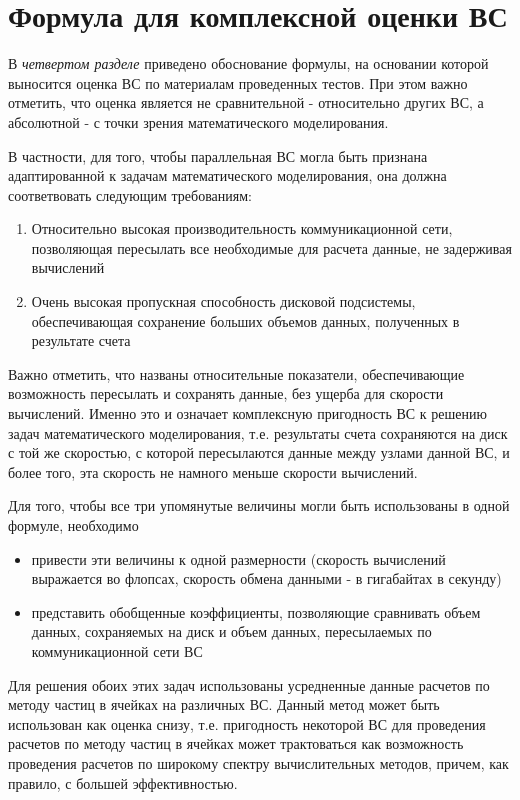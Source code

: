 \section{Формула для комплексной оценки ВС}
\label{complex_evaluation}
В \textit{четвертом разделе} приведено обоснование формулы, на основании которой выносится оценка ВС по материалам проведенных тестов. При этом важно отметить, что оценка является не сравнительной - относительно других ВС, а абсолютной - с точки зрения математического моделирования. 

В частности, для того, чтобы параллельная ВС могла быть признана адаптированной к задачам математического моделирования, она должна соответвовать следующим требованиям:
\begin{enumerate}
	\item Относительно высокая производительность коммуникационной сети, позволяющая пересылать все необходимые для расчета данные, не задерживая вычислений
	\item Очень высокая пропускная способность дисковой подсистемы, обеспечивающая сохранение больших объемов данных, полученных в результате счета  	
\end{enumerate}

Важно отметить, что названы относительные показатели, обеспечивающие возможность пересылать и сохранять данные, без ущерба для скорости вычислений. Именно это и означает  комплексную пригодность ВС к решению задач математического моделирования, т.е. результаты счета сохраняются на диск с той же скоростью, с которой пересылаются данные между узлами данной ВС, и более того, эта скорость не намного меньше скорости вычислений.

Для того, чтобы все три упомянутые величины могли быть использованы в одной формуле, необходимо 
\begin{itemize}
	\item привести эти величины к одной размерности (скорость вычислений выражается во флопсах, скорость обмена данными - в гигабайтах в секунду)
	\item представить обобщенные коэффициенты, позволяющие сравнивать объем данных, сохраняемых на диск и объем данных, пересылаемых по коммуникационной сети ВС  
\end{itemize}


Для решения обоих этих задач использованы усредненные данные расчетов по методу частиц в ячейках на различных ВС. Данный метод может быть использован как оценка снизу, т.е. пригодность некоторой ВС для проведения расчетов по методу частиц в ячейках может трактоваться как возможность проведения расчетов по широкому спектру вычислительных методов, причем, как правило, с большей эффективностью.

